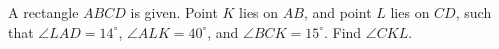 A rectangle $ABCD$ is given. Point $K$ lies on $AB$, and point $L$ lies on $CD$, such that $\angle LAD=14^{\circ}$, $\angle ALK=40^{\circ}$, and $\angle BCK=15^{\circ}$. Find $\angle CKL$.
